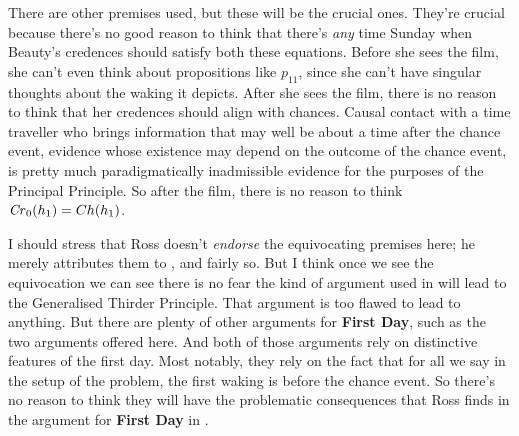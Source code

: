 \noindent There are other premises used, but these will be the crucial ones. They're crucial because there's no good reason to think that there's \textit{any} time Sunday when Beauty's credences should satisfy both these equations. Before she sees the film, she can't even think about propositions like $p_{11}$, since she can't have singular thoughts about the waking it depicts. After she sees the film, there is no reason to think that her credences should align with chances. Causal contact with a time traveller who brings information that may well be about a time after the chance event, evidence whose existence may depend on the outcome of the chance event, is pretty much paradigmatically inadmissible evidence for the purposes of the Principal Principle. So after the film, there is no reason to think $\text{\textit{Cr}}_0(h_1) = Ch(h_1)$.

I should stress that Ross doesn't \textit{endorse} the equivocating premises here; he merely attributes them to \citet{Weatherson-SoSB}, and fairly so. But I think once we see the equivocation we can see there is no fear the kind of argument used in \citet{Weatherson-SoSB} will lead to the Generalised Thirder Principle. That argument is too flawed to lead to anything. But there are plenty of other arguments for \textbf{First Day}, such as the two arguments offered here. And both of those arguments rely on distinctive features of the first day. Most notably, they rely on the fact that for all we say in the setup of the problem, the first waking is before the chance event. So there's no reason to think they will have the problematic consequences that Ross finds in the argument for \textbf{First Day} in \citet{Weatherson-SoSB}.
